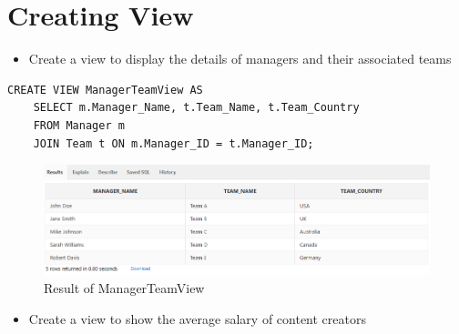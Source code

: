 \section{Creating View}
\hrulefill

\begin{itemize}
    \item Create a view to display the details of managers and their associated teams
\end{itemize}
\begin{lstlisting}[caption={ ManagerTeamView },label={lst:V-1}]
    CREATE VIEW ManagerTeamView AS
    SELECT m.Manager_Name, t.Team_Name, t.Team_Country
    FROM Manager m
    JOIN Team t ON m.Manager_ID = t.Manager_ID;
\end{lstlisting}
\begin{figure}[H]
    \centering
    \includegraphics[width=1\textwidth]{images/dml/views/v1.png}
    \caption{Result of ManagerTeamView}
\end{figure}
\begin{itemize}
    \item Create a view to show the average salary of content creators
\end{itemize}


